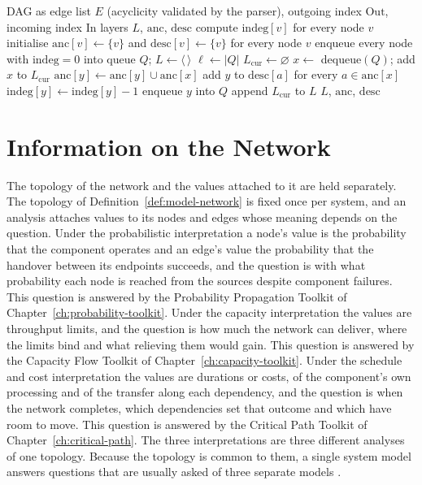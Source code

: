 \documentclass[12pt]{report}
\begin{document}
\begin{algorithm}[htbp]
\caption{Layered order with ancestor and descendant closure}
\label{alg:find-iteration-sets}
\begin{algorithmic}[1]
\Require DAG as edge list $E$ (acyclicity validated by the parser), outgoing index $\mathrm{Out}$,
  incoming index $\mathrm{In}$
\Ensure layers $L$, $\mathrm{anc}$, $\mathrm{desc}$
\State compute $\mathrm{indeg}[v]$ for every node $v$
\State initialise $\mathrm{anc}[v] \gets \{v\}$ and $\mathrm{desc}[v] \gets \{v\}$ for every node $v$
\State enqueue every node with $\mathrm{indeg} = 0$ into queue $Q$; $L \gets \langle\,\rangle$
  \State $\ell \gets |Q|$ 
  \State $L_{\text{cur}} \gets \varnothing$
    \State $x \gets$ dequeue$(Q)$; add $x$ to $L_{\text{cur}}$
      \State $\mathrm{anc}[y] \gets \mathrm{anc}[y] \cup \mathrm{anc}[x]$
      \State add $y$ to $\mathrm{desc}[a]$ for every $a \in \mathrm{anc}[x]$
      \State $\mathrm{indeg}[y] \gets \mathrm{indeg}[y] - 1$
       enqueue $y$ into $Q$ \EndIf
    \EndFor
  \EndFor
  \State append $L_{\text{cur}}$ to $L$
\EndWhile
\State \Return $L$, $\mathrm{anc}$, $\mathrm{desc}$
\end{algorithmic}
\end{algorithm}

\section{Information on the Network}
\label{sec:model-information}

The topology of the network and the values attached to it are held separately. The topology of
Definition~\ref{def:model-network} is fixed once per system, and an analysis attaches values to
its nodes and edges whose meaning depends on the question. Under the probabilistic interpretation a
node's value is the probability that the component operates and an edge's value the
probability that the handover between its endpoints succeeds, and the question is with what
probability each node is reached from the sources despite component failures. This question is
answered by the Probability Propagation Toolkit of Chapter~\ref{ch:probability-toolkit}. Under
the capacity interpretation the values are throughput limits, and the question is how much the network
can deliver, where the limits bind and what relieving them would gain. This question is answered
by the Capacity Flow Toolkit of Chapter~\ref{ch:capacity-toolkit}. Under the schedule and cost
interpretation the values are durations or costs, of the component's own processing and of the
transfer along each dependency, and the question is when the network completes, which
dependencies set that outcome and which have room to move. This question is answered by the
Critical Path Toolkit of Chapter~\ref{ch:critical-path}. The three interpretations are three
different analyses of one topology. Because the topology is common to them, a single system
model answers questions that are usually asked of three separate models
\cite{ouyang2014interdependent}.
\end{document}
